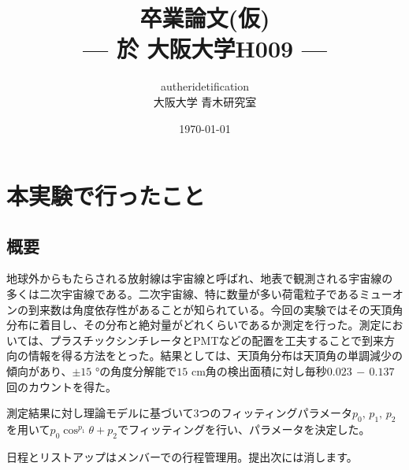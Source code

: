 \documentclass[a4paper,dvipdfmx,titlepage,oneside]{jsarticle}
\title{卒業論文(仮)
\large{\\--- 於 大阪大学H009 ---}}
\author{auther\quad\quad idetification\\大阪大学 青木研究室}
\date{\today}
\numberwithin{equation}{section}
\numberwithin{table}{section}
\numberwithin{figure}{section}
\begin{document}
	\maketitle
	\tableofcontents
\section{本実験で行ったこと}
	\subsection{概要}
		地球外からもたらされる放射線は宇宙線と呼ばれ、地表で観測される宇宙線の多くは二次宇宙線である。二次宇宙線、特に数量が多い荷電粒子であるミューオンの到来数は角度依存性があることが知られている。今回の実験ではその天頂角分布に着目し、その分布と絶対量がどれくらいであるか測定を行った。測定においては、プラスチックシンチレータとPMTなどの配置を工夫することで到来方向の情報を得る方法をとった。結果としては、天頂角分布は天頂角の単調減少の傾向があり、$\pm15$ \si{\degree}の角度分解能で$15$ cm角の検出面積に対し毎秒$0.023\,-\,0.137$回のカウントを得た。

		測定結果に対し理論モデルに基づいて3つのフィッティングパラメータ$p_0,\,p_1,\,p_2$を用いて$p_0\cos^{p_1}\theta+p_2$でフィッティングを行い、パラメータを決定した。

	\newpage
	日程とリストアップはメンバーでの行程管理用。提出次には消します。
\end{document}

